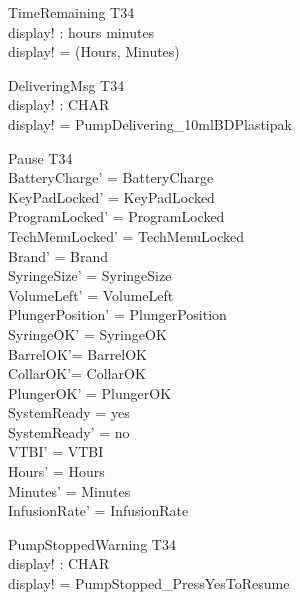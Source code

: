 \documentclass[landscape]{article}
\begin{document}
\begin{schema} {TimeRemaining}
\Xi T34\\
display! : hours \cross minutes\\
\where
display! = (Hours, Minutes)\\
\end{schema}

\begin{schema} {DeliveringMsg}
\Xi T34\\
display! : CHAR\\
\where
display! =  PumpDelivering\_10mlBDPlastipak\\
\end{schema}

\begin{schema} {Pause}
\Delta T34\\
\where
BatteryCharge' =  BatteryCharge \\
KeyPadLocked' = KeyPadLocked\\
ProgramLocked' = ProgramLocked \\
TechMenuLocked' = TechMenuLocked\\
Brand' = Brand\\ 
SyringeSize' = SyringeSize\\
VolumeLeft' = VolumeLeft\\
PlungerPosition' = PlungerPosition \\
SyringeOK' = SyringeOK\\
BarrelOK'= BarrelOK\\
CollarOK'= CollarOK\\
PlungerOK' = PlungerOK \\
SystemReady = yes\\
SystemReady' = no\\
VTBI' = VTBI\\
Hours' = Hours\\
Minutes' = Minutes\\
InfusionRate' = InfusionRate\\
\end{schema}

\begin{schema} {PumpStoppedWarning}
\Xi T34\\
display! : CHAR\\
\where
display! =  PumpStopped\_PressYesToResume\\
\end{schema}
\end{document}
